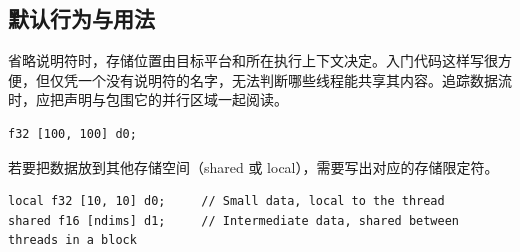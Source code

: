 \subsection*{默认行为与用法}

省略说明符时，存储位置由目标平台和所在执行上下文决定。入门代码这样写很方便，但仅凭一个没有说明符的名字，无法判断哪些线程能共享其内容。追踪数据流时，应把声明与包围它的并行区域一起阅读。

\begin{lstlisting}[language=croqtile,caption={不带说明符的声明}]
f32 [100, 100] d0;
\end{lstlisting}

若要把数据放到其他存储空间（shared 或 local），需要写出对应的存储限定符。

\begin{lstlisting}[language=croqtile,caption={显式选择 local 存储}]
local f32 [10, 10] d0;     // Small data, local to the thread
shared f16 [ndims] d1;     // Intermediate data, shared between threads in a block
\end{lstlisting}
